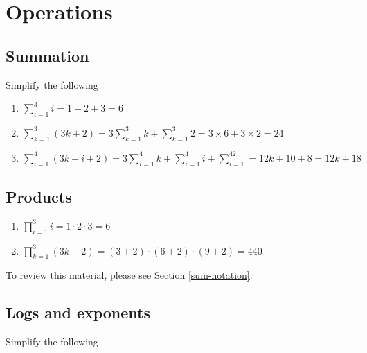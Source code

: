 \documentclass[]{book}
\theoremstyle{definition}
\theoremstyle{definition}
\theoremstyle{definition}
\theoremstyle{remark}
\begin{document}
\hypertarget{operations-1}{%
\section*{Operations}\label{operations-1}}

\hypertarget{summation-1}{%
\subsection*{Summation}\label{summation-1}}

Simplify the following

\begin{enumerate}
\def\labelenumi{\arabic{enumi}.}
\item
  \(\sum\limits_{i = 1}^3 i = 1 + 2+ 3 = 6\)
\item
  \(\sum\limits_{k = 1}^3(3k + 2) = 3\sum\limits_{k=1}^3k + \sum\limits_{k=1}^3 2= 3\times 6 + 3\times 2 = 24\)
\item
  \(\sum\limits_{i= 1}^4 (3k + i + 2) = 3\sum\limits_{i= 1}^4k + \sum\limits_{i= 1}^4i + \sum\limits_{i= 1}^42 = 12k + 10 + 8 = 12k + 18\)
\end{enumerate}

\hypertarget{products-1}{%
\subsection*{Products}\label{products-1}}

\begin{enumerate}
\def\labelenumi{\arabic{enumi}.}
\item
  \(\prod\limits_{i= 1}^3 i = 1\cdot 2\cdot 3 = 6\)
\item
  \(\prod\limits_{k=1}^3(3k + 2) = (3 + 2)\cdot (6 + 2)\cdot (9 + 2) = 440\)
\end{enumerate}

To review this material, please see Section \ref{sum-notation}.

\hypertarget{logs-and-exponents-1}{%
\subsection*{Logs and exponents}\label{logs-and-exponents-1}}

Simplify the following
\end{document}
